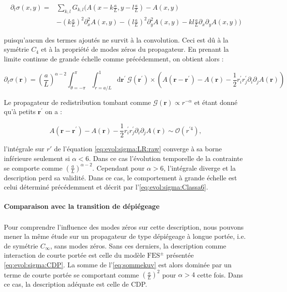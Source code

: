 \begin{equation}
\begin{aligned}
    \partial_t\sigma (x,y) =& \sum_{k,l}G_ {k,l}\Big(A(x-k\frac{a}{L}, y-l\frac{a}{L})-A(x,y)\\
    &-\left(k\frac{a}{L}\right)^2\partial_x^2A(x,y)-\left(l\frac{a}{L}\right)^2\partial_y^2A(x,y)
    -kl\frac{a}{L}\partial_x\partial_yA(x,y)\Big)
\end{aligned}
\end{equation}

\noindent puisqu'aucun des termes ajoutés ne survit à la convolution. Ceci est dû à la symétrie $C_4$ et à la propriété de modes zéros du propagateur. En prenant la limite continue de grande échelle comme précédemment, on obtient alors :

\begin{equation}
   \partial_t \sigma(\mathbf{r}) = \left( \frac{a}{L} \right)^{\alpha - 2}\int_{\theta=-\pi}^\pi\int_{r=a/L}^{1} \mathrm{d}\mathbf{r}^\prime ~ \mathcal{G}(\mathbf{r}^\prime)
     \times\left( A(\mathbf{r}-\mathbf{r}^\prime)-A(\mathbf{r})-\frac{1}{2}r_i^\prime r_j^\prime \partial_i\partial_jA(\mathbf{r}) \right)
    \label{eq:evol:sigma:LR:raw}
\end{equation}

\noindent Le propagateur de redistribution tombant comme $\mathcal{G}(\mathbf{r})\propto r^{-\alpha}$ et étant donné qu'à petits $\mathbf{r}^\prime$ on a :

\begin{equation}
A(\mathbf{r}-\mathbf{r}^\prime)-A(\mathbf{r})-\frac{1}{2}r_i^\prime r_j^\prime \partial_i\partial_jA(\mathbf{r}) \sim\mathcal{O}(r^{\prime 4}),
\end{equation}

\noindent l'intégrale sur $r'$ de l'équation \autoref{eq:evol:sigma:LR:raw} converge à sa borne inférieure seulement si $\alpha < 6$. Dans ce cas l'évolution temporelle de la contrainte se comporte comme $\left( \frac{a}{L} \right)^{\alpha - 2}$. Cependant pour $\alpha>6$, l'intégrale diverge et la description perd sa validité. Dans ce cas, le comportement à grande échelle est celui déterminé précédemment et décrit par l'\autoref{eq:evol:sigma:Classa6}.

\paragraph{Comparaison avec la transition de dépiégeage}

\subparagraph{}Pour comprendre l'influence des modes zéros sur cette description, nous pouvons mener la même étude sur un propagateur de type dépiégeage à longue portée, i.e. de symétrie $C_\infty$, sans modes zéros. Sans ces derniers, la description comme interaction de courte portée est celle du modèle $\text{FES}^\pm$ présentée \autoref{eq:evol:sigma:CDP}. La somme de l'\autoref{eq:sommekuv} est alors dominée par un terme de courte portée se comportant comme $\left(  \frac{a}{L}\right)^2$ pour $\alpha>4$ cette fois. Dans ce cas, la description adéquate est celle de CDP.

